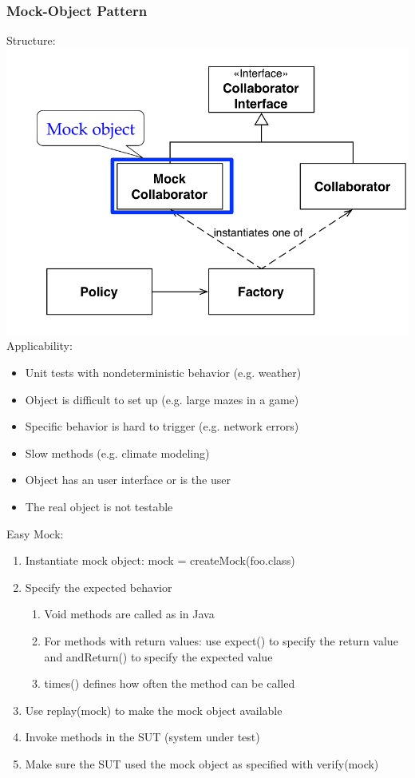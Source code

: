 \subsubsection{Mock-Object Pattern}
Structure:\\
\includegraphics[width=.75\linewidth]{images/testing_pattern_mock_object.png}\\
Applicability:
\begin{itemize}
  \item Unit tests with nondeterministic behavior (e.g. weather)
  \item Object is difficult to set up (e.g. large mazes in a game)
  \item Specific behavior is hard to trigger (e.g. network errors)
  \item Slow methods (e.g. climate modeling)
  \item Object has an user interface or is the user
  \item The real object is not testable
\end{itemize}
Easy Mock:
\begin{enumerate}
  \item Instantiate mock object: mock = createMock(foo.class)
  \item Specify the expected behavior
  \begin{enumerate}
    \item Void methods are called as in Java
    \item For methods with return values: use expect() to specify the return value and andReturn() to specify the expected value
    \item times() defines how often the method can be called
  \end{enumerate}
  \item Use replay(mock) to make the mock object available
  \item Invoke methods in the SUT (system under test)
  \item Make sure the SUT used the mock object as specified with verify(mock)
\end{enumerate}
\newpage

